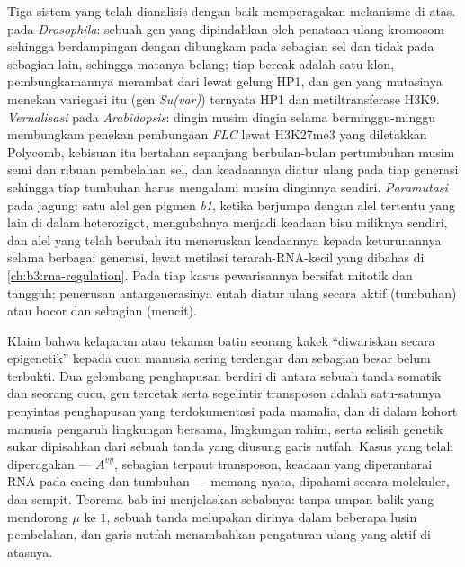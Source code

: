 \begin{proposition}\label{prop:b3:chromatin-epigenetics:examples}
Tiga sistem yang telah dianalisis dengan baik memperagakan mekanisme di atas.
\emph{} pada \emph{Drosophila}: sebuah gen yang
dipindahkan oleh penataan ulang kromosom sehingga berdampingan dengan
 dibungkam pada sebagian sel dan tidak pada sebagian lain,
sehingga matanya belang; tiap bercak adalah satu klon, pembungkamannya
merambat dari  lewat gelung HP1, dan gen yang mutasinya menekan
variegasi itu (gen \emph{Su(var)}) ternyata HP1 dan metiltransferase H3K9.
\emph{Vernalisasi} pada \emph{Arabidopsis}: dingin musim dingin selama
berminggu-minggu membungkam penekan pembungaan \emph{FLC} lewat H3K27me3 yang
diletakkan Polycomb, kebisuan itu bertahan sepanjang berbulan-bulan
pertumbuhan musim semi dan ribuan pembelahan sel, dan keadaannya diatur ulang
pada tiap generasi sehingga tiap tumbuhan harus mengalami musim dinginnya
sendiri. \emph{Paramutasi} pada jagung: satu alel gen pigmen \emph{b1},
ketika berjumpa dengan alel tertentu yang lain di dalam heterozigot,
mengubahnya menjadi keadaan bisu miliknya sendiri, dan alel yang telah
berubah itu meneruskan keadaannya kepada keturunannya selama berbagai
generasi, lewat metilasi terarah-RNA-kecil yang dibahas di
\cref{ch:b3:rna-regulation}. Pada tiap kasus pewarisannya bersifat mitotik
dan tangguh; penerusan antargenerasinya entah diatur ulang secara aktif
(tumbuhan) atau bocor dan sebagian (mencit).
\end{proposition}

\begin{remark}\label{rem:b3:chromatin-epigenetics:limits}
Klaim bahwa kelaparan atau tekanan batin seorang kakek ``diwariskan secara
epigenetik'' kepada cucu manusia sering terdengar dan sebagian besar belum
terbukti. Dua gelombang penghapusan berdiri di antara sebuah tanda somatik
dan seorang cucu, gen tercetak serta segelintir transposon adalah satu-satunya
penyintas penghapusan yang terdokumentasi pada mamalia, dan di dalam kohort
manusia pengaruh lingkungan bersama, lingkungan rahim, serta selisih genetik
sukar dipisahkan dari sebuah tanda yang diusung garis nutfah. Kasus yang
telah diperagakan --- $A^{vy}$, sebagian  terpaut transposon, keadaan
yang diperantarai RNA pada cacing dan tumbuhan --- memang nyata, dipahami
secara molekuler, dan sempit. Teorema bab ini menjelaskan sebabnya: tanpa
umpan balik yang mendorong $\mu$ ke $1$, sebuah tanda melupakan dirinya dalam
beberapa lusin pembelahan, dan garis nutfah menambahkan pengaturan ulang yang
aktif di atasnya.
\end{remark}

